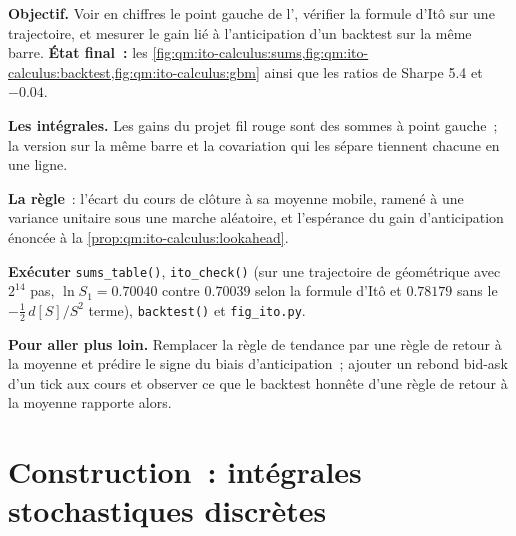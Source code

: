 \begin{tutorial}
\textbf{Objectif.} Voir en chiffres le point gauche de l', vérifier la formule d'Itô sur une
trajectoire, et mesurer le gain lié à l'anticipation d'un backtest sur la même barre. \textbf{État final~:}
les \cref{fig:qm:ito-calculus:sums,fig:qm:ito-calculus:backtest,fig:qm:ito-calculus:gbm} ainsi que les
ratios de Sharpe 5.4 et $-0.04$.
\begin{tutsteps}
\item \textbf{Les intégrales.} Les gains du projet fil rouge sont des sommes à point gauche~; la version
sur la même barre et la covariation qui les sépare tiennent chacune en une ligne.
\label{lst:qm:ito-calculus:gains}
\item \textbf{La règle}~: l'écart du cours de clôture à sa moyenne mobile, ramené à une variance unitaire
sous une marche aléatoire, et l'espérance du gain d'anticipation énoncée à la \cref{prop:qm:ito-calculus:lookahead}.
\label{lst:qm:ito-calculus:signal}
\item \textbf{Exécuter} \texttt{sums\_table()}, \texttt{ito\_check()} (sur une trajectoire de  géométrique avec $2^{14}$ pas,
$\ln S_1 = 0.70040$ contre $0.70039$ selon la formule d'Itô et $0.78179$ sans le $-\tfrac12\,d[S]/S^2$
terme), \texttt{backtest()} et \texttt{fig\_ito.py}.
\end{tutsteps}
\textbf{Pour aller plus loin.} Remplacer la règle de tendance par une règle de retour à la moyenne et prédire le signe
du biais d'anticipation~; ajouter un rebond bid-ask d'un tick aux cours et observer ce que le backtest honnête
d'une règle de retour à la moyenne rapporte alors.
\end{tutorial}

\section{Construction~: intégrales stochastiques discrètes}\label{bld:qm:ito-calculus:stochint}


